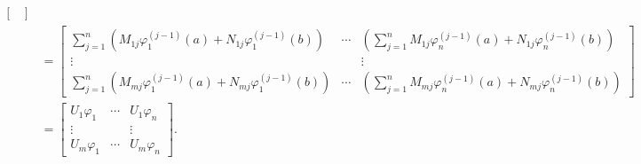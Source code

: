 \documentclass[10.5pt, oneside, a4paper]{article}
\begin{document}
{\begin{rmk}
\begin{align*}
\begin{bmatrix}
        \end{bmatrix}\\
        &= \begin{bmatrix}
            \sum_{j=1}^n(M_{1j}\varphi_1^{(j-1)}(a) + N_{1j}\varphi_1^{(j-1)}(b)) & \cdots & (\sum_{j=1}^nM_{1j}\varphi_n^{(j-1)}(a) + N_{1j}\varphi_n^{(j-1)}(b))\\
            \vdots & & \vdots\\
            \sum_{j=1}^n(M_{mj}\varphi_1^{(j-1)}(a) + N_{mj}\varphi_1^{(j-1)}(b)) & \cdots & (\sum_{j=1}^nM_{mj}\varphi_n^{(j-1)}(a) + N_{mj}\varphi_n^{(j-1)}(b))
        \end{bmatrix}\\
        &= \begin{bmatrix}
            U_1\varphi_1 & \cdots & U_1\varphi_n\\
            \vdots & & \vdots\\
            U_m\varphi_1 & \cdots & U_m\varphi_n
        \end{bmatrix}.
    \end{align*}
\end{rmk}
}
\end{document}
